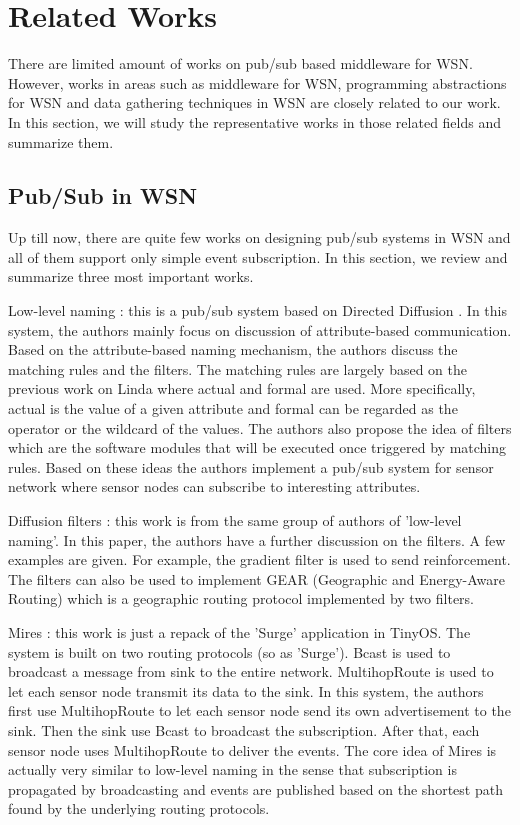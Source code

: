\section{Related Works}
There are limited amount of works on pub/sub based middleware for WSN. However, works in areas such as middleware for WSN, programming abstractions for WSN and data gathering techniques in WSN are closely related to our work. In this section, we will study the representative works in those related fields and summarize them.
\subsection{Pub/Sub in WSN}
Up till now, there are quite few works on designing pub/sub systems in WSN and all of them support only simple event subscription. In this section, we review and summarize three most important works.

Low-level naming \cite{lowlevelnaming}: this is a pub/sub system based on Directed Diffusion \cite{directeddiffusion}. In this system, the authors mainly focus on discussion of attribute-based communication. Based on the attribute-based naming mechanism, the authors discuss the matching rules and the filters. The matching rules are largely based on the previous work on Linda \cite{linda} where actual and formal are used. More specifically, actual is the value of a given attribute and formal can be regarded as the operator or the wildcard of the values. The authors also propose the idea of filters which are the software modules that will be executed once triggered by matching rules. Based on these ideas the authors implement a pub/sub system for sensor network where sensor nodes can subscribe to interesting attributes.

Diffusion filters \cite{diffusionfilters}: this work is from the same group of authors of 'low-level naming'. In this paper, the authors have a further discussion on the filters. A few examples are given. For example, the gradient filter is used to send reinforcement. The filters can also be used to implement GEAR \cite{gear} (Geographic and Energy-Aware Routing) which is a geographic routing protocol implemented by two filters.

Mires \cite{mires}: this work is just a repack of the 'Surge' application in TinyOS. The system is built on two routing protocols (so as 'Surge'). Bcast is used to broadcast a message from sink to the entire network. MultihopRoute is used to let each sensor node transmit its data to the sink. In this system, the authors first use MultihopRoute to let each sensor node send its own advertisement to the sink. Then the sink use Bcast to broadcast the subscription. After that, each sensor node uses MultihopRoute to deliver the events. The core idea of Mires is actually very similar to low-level naming in the sense that subscription is propagated by broadcasting and events are published based on the shortest path found by the underlying routing protocols.

